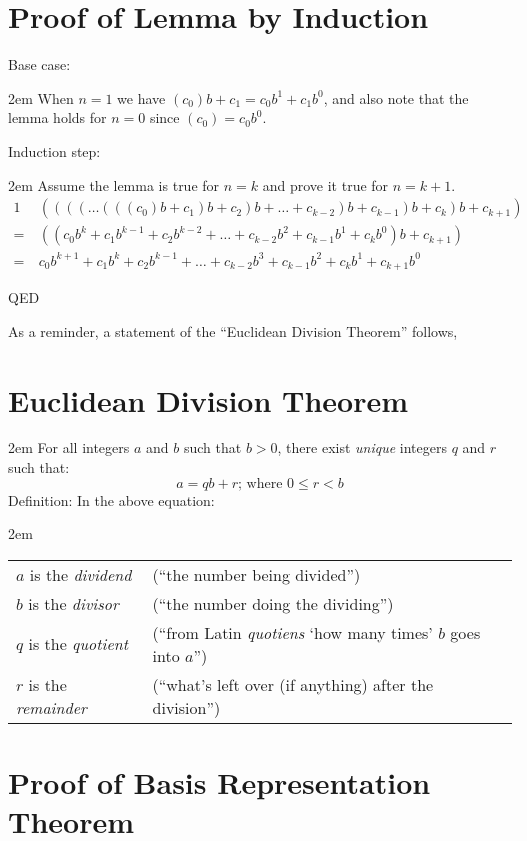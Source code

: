 \documentclass{article}
\newenvironment{jprIn}{\begin{adjustwidth}{2em}{}}{\end{adjustwidth}}
\begin{document}
\section*{Proof of Lemma by Induction}
Base case:
\begin{jprIn}
When \(n=1\) we have \((c_0)b + c_1 = c_0b^1 + c_1b^0\), and
also note that the lemma holds for \(n=0\) since \((c_0) = c_0b^0\).
\end{jprIn}
Induction step:
\begin{jprIn}
Assume the lemma is true for \(n=k\) and prove it true for \(n=k+1\).
{\small
\begin{alignat*}{1}
&((((\dots{}(((c_0)b + c_1)b + c_2)b + \dots{} + c_{k-2})b + c_{k-1})b + c_k)b + c_{k+1})\\
=\  &((c_0b^k + c_1b^{k-1} + c_2b^{k-2} + \dots{} + c_{k-2}b^2 + c_{k-1}b^1 + c_{k}b^0)b + c_{k+1})\\
=\  &c_0b^{k+1} + c_1b^{k} + c_2b^{k-1} + \dots{} + c_{k-2}b^3 + c_{k-1}b^2 + c_{k}b^1 + c_{k+1}b^0
\end{alignat*}
}
\end{jprIn}
QED

As a reminder, a statement of the ``Euclidean Division Theorem'' follows,
\section*{Euclidean Division Theorem}
\begin{jprIn}
For all integers \(a\) and \(b\) such that \(b>0\),
there exist \emph{unique} integers \(q\) and \(r\) such that:
\[a=qb+r  \text{; where } 0\le{}r<b\]
Definition: In the above equation:
\begin{jprIn}
\begin{tabular}{l l}
\(a\) is the \emph{dividend} & (``the number being divided'')\\
\(b\) is the \emph{divisor} & (``the number doing the dividing'')\\
\(q\) is the \emph{quotient} & (``from Latin \emph{quotiens} `how many times' \(b\) goes into \(a\)'')\\
\(r\) is the \emph{remainder} & (``what's left over (if anything) after the division'')
\end{tabular}
\end{jprIn}
\end{jprIn}

\section*{Proof of Basis Representation Theorem}
\end{document}
